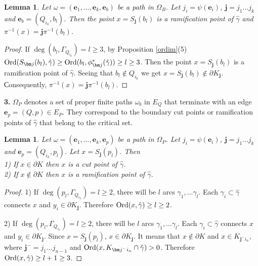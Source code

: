 \documentclass[11pt,reqno]{amsart}
\newtheorem{lemma}[theorem]{Lemma}
\newcommand{\be}{{\bm e}}
\newcommand{\bj}{{\bm j}}
\begin{document}
\begin{lemma}\label{path_bk}
    Let $\omega=(\be_1,...,\be_k,\be_b)$ be a path in $\Omega_B$. Let  $j_i=\psi(\be_i)$, $\bj=j_1...j_k$ and ${\bm e}_b = (Q_{i_k}, b_l)$.  
   Then  the point $x = S_\bj(b_l)$ is a ramification point of  $\hat \gamma$ and $\pi^{-1}(x) = {\bm j}\pi^{-1}(b_l)$.

\end{lemma}
 \begin{proof}
 If  $\deg (b_l, \Gamma_{Q_{i_k}}) = l \geq 3$, by Proposition \ref{ordim}(5)\\ ${\mathop{\rm Ord} \nolimits}(S_{\bm j}(b_l), \hat \gamma)\geq {\mathop{\rm Ord} \nolimits}(b_l, \phi^*_{\bm j}(\hat \gamma)) \geq l \geq 3$. Then the point $x = S_{\bm j}(b_l)$ is a ramification point of  $\hat \gamma$. Seeing that $b_l \notin Q_{i_k}$ we get  $x = S_{\bm j}(b_l) \notin \partial K_{{\bm j}}$. Сonsequently, $\pi^{-1}(x) = {\bm j}\pi^{-1}(b_l)$.
 \end{proof}



{\bf 3.} $\Omega_P$ denotes a set of proper finite paths $\omega_b$ in $E_Q$ that terminate with an edge $\be_p=(Q,p )\in E_P$. They  correspond to the boundary cut points or ramification points of $\hat{\gamma}$ that belong to the critical set.

\begin{lemma}\label{path_pk}
    Let $\omega=(\be_1,...,\be_k,\be_p)$ be a path in $\Omega_P$. Let  $j_i=\psi(\be_i)$, $\bj=j_1...j_k$ and ${\bm e}_p = (Q_{i_k}, p_l)$.  
   Let $x = S_\bj(p_l)$. Then\\
   1) If $x\in \partial K$ then $x$ is a cut point of $\hat \gamma$.\\
2) If $x\notin \partial K$ then $x$ is a ramification point of $\hat \gamma$.

\end{lemma}


 \begin{proof}
 1) If  $\deg (p_l, \Gamma_{Q_{i_n}}) = l \geq 2$, there will be $l$ arcs $\gamma_1, \dots \gamma_l$. Each $\gamma_i \subset \hat{\gamma}$ connects $x$ and $y_i \in \partial K_{{\bj}}$. Therefore ${\mathop{\rm Ord} \nolimits}(x, \hat \gamma) \geq l \geq 2$.

 2)  If  $\deg (p_l, \Gamma_{Q_{i_n}}) = l \geq 2$, there will be $l$ arcs $\gamma_1, \dots \gamma_l$. Each $\gamma_i \subset \hat{\gamma}$ connects $x$ and $y_i \in \partial K_{\bj}$. Since $x= S_{\bj}(p_l)$,  $x\in \partial K_{\bj}$. It means that $x\notin \partial K$ and $x\in K_{\bj^{-} i_n}$, where $\bj^{-} = j_1\hdots j_{n-1}$ and ${\mathop{\rm Ord} \nolimits}(x, K_{\bj^{-} i_n} \cap \hat{\gamma}) > 0$. Therefore ${\mathop{\rm Ord} \nolimits}(x, \hat \gamma) \geq l+1 \geq 3$.

 \end{proof}
\end{document}

